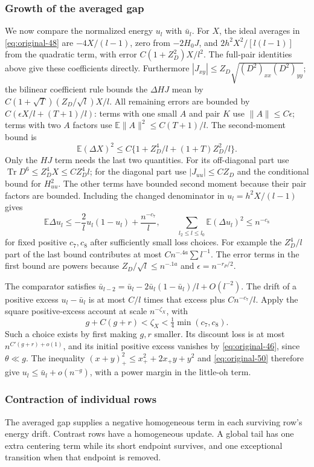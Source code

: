 \subsubsection*{Growth of the averaged gap}
We now compare the normalized energy $u_l$ with $\bar u_l$.
For $X$, the ideal averages in \eqref{eq:original-48} are
$-4X/(l-1)$, zero from $-2H_0J$, and
$2h^2X^2/[l(l-1)]$ from the quadratic term, with error
$C(1+Z_D^2)X/l^2$.  The full-pair identities above give these
coefficients directly.  Furthermore
$|J_{xy}|\le Z_D\sqrt{(D^2)_{xx}(D^2)_{yy}}$; the bilinear
coefficient rule bounds the $\Delta H J$ mean by
$C(1+\sqrt T)(Z_D/\sqrt l)X/l$.
All remaining errors are bounded by
$C(\epsilon X/l+(T+1)/l)$: terms with one small $A$ and pair $K$
use $\|A\|\le C\epsilon$; terms with two $A$ factors use
$\mathbb E\|A\|^2\le C(T+1)/l$.
The second-moment bound is
\[
 \mathbb E(\Delta X)^2
 \le C\{1+Z_D^4/l+(1+T)Z_D^2/l\}.
\]
Only the $HJ$ term needs the last two quantities.  For its
off-diagonal part use
$\operatorname{Tr}D^6\le Z_D^4X\le CZ_D^4l$; for the diagonal
part use $|J_{uu}|\le C Z_D$ and the conditional bound for
$H_{uu}^2$.  The other terms have bounded second moment because
their pair factors are bounded.
Including the changed denominator in $u_l=h^2X/(l-1)$ gives
\begin{equation}
 \mathbb E\Delta u_l
   \le-\frac2l u_l(1-u_l)+\frac{n^{-c_7}}l,
 \qquad
 \sum_{l_2\le l\le l_0}\mathbb E(\Delta u_l)^2
   \le n^{-c_8}
 \label{eq:original-50}
\end{equation}
for fixed positive $c_7,c_8$ after sufficiently small loss choices.
For example the $Z_D^4/l$ part of the last bound contributes at
most $Cn^{-.4a}\sum l^{-1}$.  The error terms in the first bound
are powers because $Z_D/\sqrt l\le n^{-.1a}$ and
$\epsilon=n^{-r_P/2}$.

The comparator satisfies
$\bar u_{l-2}=\bar u_l-2\bar u_l(1-\bar u_l)/l+O(l^{-2})$.
The drift of a positive excess $u_l-\bar u_l$ is at most
$C/l$ times that excess plus $Cn^{-c_7}/l$.
Apply the square positive-excess account at scale
$n^{-\zeta_X}$, with
\[
 g+C(g+r)<\zeta_X<\tfrac14\min(c_7,c_8).
\]
Such a choice exists by first making $g,r$ smaller.  Its discount
loss is at most $n^{C'(g+r)+o(1)}$, and its initial positive excess
vanishes by \eqref{eq:original-46}, since $\theta\ll g$.
The inequality
$(x+y)_+^2\le x_+^2+2x_+y+y^2$ and
\eqref{eq:original-50} therefore give
$u_l\le\bar u_l+o(n^{-g})$, with a power margin in the little-oh
term.

\subsubsection*{Contraction of individual rows}
The averaged gap supplies a negative homogeneous term in each surviving
row's energy drift.
Contrast rows have a homogeneous update.  A global tail has one extra
centering term while its short endpoint survives, and one exceptional
transition when that endpoint is removed.

